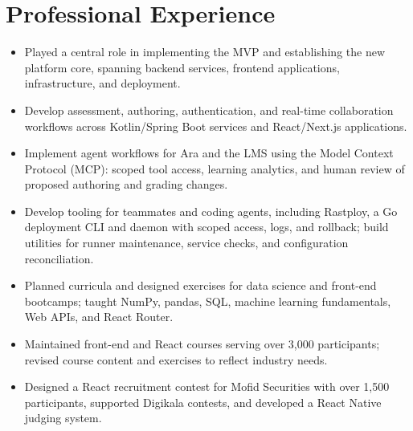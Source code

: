 \section{Professional Experience}
\begin{itemize}
  \item Played a central role in implementing the MVP and establishing the new platform core, spanning backend services, frontend applications, infrastructure, and deployment.
  \item Develop assessment, authoring, authentication, and real-time collaboration workflows across Kotlin/Spring Boot services and React/Next.js applications.
  \item Implement agent workflows for Ara and the LMS using the Model Context Protocol (MCP): scoped tool access, learning analytics, and human review of proposed authoring and grading changes.
  \item Develop tooling for teammates and coding agents, including Rastploy, a Go deployment CLI and daemon with scoped access, logs, and rollback; build utilities for runner maintenance, service checks, and configuration reconciliation.
\end{itemize}

\begin{itemize}
  \item Planned curricula and designed exercises for data science and front-end bootcamps; taught NumPy, pandas, SQL, machine learning fundamentals, Web APIs, and React Router.
\end{itemize}
\begin{itemize}
  \item Maintained front-end and React courses serving over 3,000 participants; revised course content and exercises to reflect industry needs.
\end{itemize}
\begin{itemize}
  \item Designed a React recruitment contest for Mofid Securities with over 1,500 participants, supported Digikala contests, and developed a React Native judging system.
\end{itemize}
